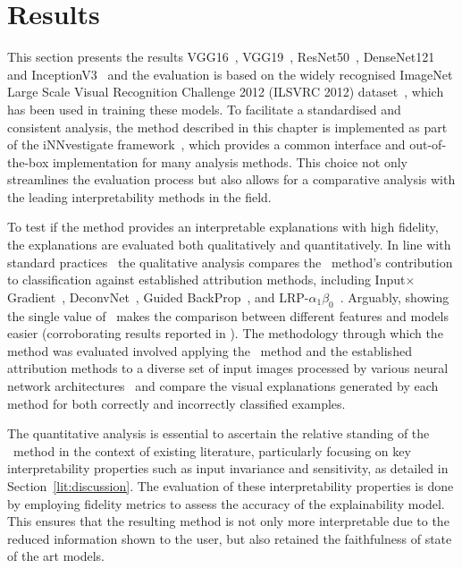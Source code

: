 \section{Results}
\label{sec:results}

This section presents the results VGG16~\cite{SimonyanZ14a}, VGG19~\cite{SimonyanZ14a}, ResNet50~\cite{he2015deep}, DenseNet121~\cite{huang2018densely} and InceptionV3~\cite{szegedy2015rethinking} and the evaluation is based on the widely recognised ImageNet Large Scale Visual Recognition Challenge 2012 (ILSVRC 2012) dataset~\cite{ILSVRC15}, which has been used in training these models. To facilitate a standardised and consistent analysis, the \CTC\/ method described in this chapter is implemented as part of the iNNvestigate framework~\cite{inn}, which provides a common interface and out-of-the-box implementation for many analysis methods. This choice not only streamlines the evaluation process but also allows for a comparative analysis with the leading interpretability methods in the field.


To test if the \CTC\/ method provides an interpretable explanations with high fidelity, the explanations are evaluated both qualitatively and quantitatively. In line with standard practices~\cite{SundararajanTY17, ShrikumarGK17, SelvarajuCDVPB20, SmilkovTKVW17, AnconaCO018, kindermans2017learning} the qualitative analysis compares the \CTC\ method's contribution to classification against established attribution methods, including Input$\times$Gradient~\cite{SimonyanVZ13}, DeconvNet~\cite{ZeilerKTF10}, Guided BackProp~\cite{SpringenbergDBR14}, and LRP-$\alpha_1\beta_0$~\cite{bach2015pixel}. Arguably, showing the single value of \CTC\ makes the comparison between different features and models easier (corroborating results reported in \cite{Ribeiro0G16}). The methodology through which the method was evaluated involved applying the \CTC\ method and the established attribution methods to a diverse set of input images processed by various neural network architectures~\cite{SimonyanZ14a, SimonyanZ14a, he2015deep, huang2018densely, szegedy2015rethinking} and compare the visual explanations generated by each method for both correctly and incorrectly classified examples.

The quantitative analysis is essential to ascertain the relative standing of the \CTC\ method in the context of existing literature, particularly focusing on key interpretability properties such as input invariance and sensitivity, as detailed in Section~\ref{lit:discussion}. The evaluation of these interpretability properties is done by employing fidelity metrics to assess the accuracy of the explainability model. This ensures that the resulting method is not only more interpretable due to the reduced information shown to the user, but also retained the faithfulness of state of the art models.


